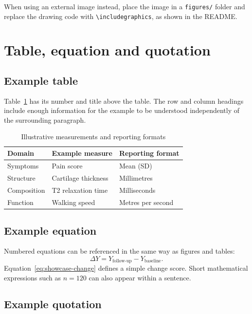 When using an external image instead, place the image in a
\texttt{figures/} folder and replace the drawing code with
\verb|\includegraphics|, as shown in the README.

\section{Table, equation and quotation}

\subsection{Example table}

Table~\ref{tab:showcase-measures} has its number and title above the table.
The row and column headings include enough information for the example to be
understood independently of the surrounding paragraph.

\begin{table}[htbp]
  \caption{Illustrative measurements and reporting formats}
  \label{tab:showcase-measures}
  \centering
  \begin{tabular}{lll}
    \toprule
    Domain & Example measure & Reporting format \\
    \midrule
    Symptoms & Pain score & Mean (SD) \\
    Structure & Cartilage thickness & Millimetres \\
    Composition & T2 relaxation time & Milliseconds \\
    Function & Walking speed & Metres per second \\
    \bottomrule
  \end{tabular}
\end{table}

\subsection{Example equation}

Numbered equations can be referenced in the same way as figures and tables:
\begin{equation}
  \Delta Y = Y_{\mathrm{follow\text{-}up}} - Y_{\mathrm{baseline}}.
  \label{eq:showcase-change}
\end{equation}
Equation~\ref{eq:showcase-change} defines a simple change score. Short
mathematical expressions such as \(n=120\) can also appear within a sentence.

\subsection{Example quotation}

